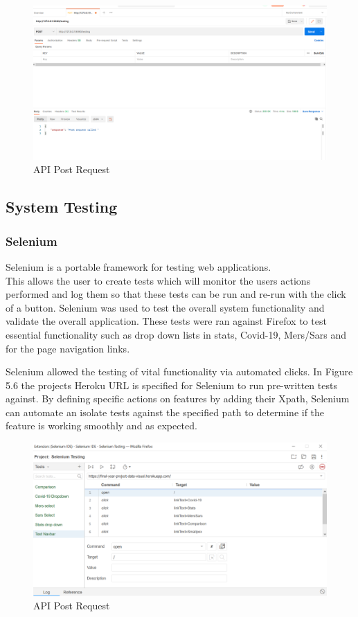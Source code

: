 \begin{figure}[H]
    \centering
    \includegraphics[scale=0.3]{img/Testpost.PNG}
    \caption{API Post Request}
    \label{fig:my_label12}
\end{figure}



\subsection{System Testing}

\subsubsection{Selenium}

Selenium is a portable framework for testing web applications.\cite{selenium}\\ This allows the user to create tests which will monitor the users actions performed and log them so that these tests can be run and re-run with the click of a button. Selenium was used to test the overall system functionality and validate the overall application. These tests were ran against Firefox to test essential functionality such as drop down lists in stats, Covid-19, Mers/Sars and for the page navigation links. 

Selenium allowed the testing of vital functionality via automated clicks. In Figure 5.6 the projects Heroku URL is specified for Selenium to run pre-written tests against. By defining specific actions on features by adding their Xpath, Selenium can automate an isolate tests against the specified path to determine if the feature is working smoothly and as expected.
\begin{figure}[H]
    \centering
    \includegraphics[scale=0.4]{img/sel.PNG}
    \caption{API Post Request}
    \label{fig:my_label22}
\end{figure}



